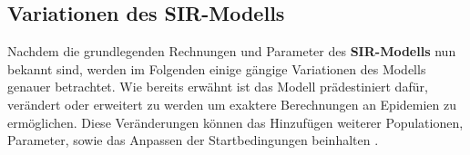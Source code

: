 \documentclass[12pt]{scrartcl} %
\begin{document}










\subsection{Variationen des SIR-Modells}

Nachdem die grundlegenden Rechnungen und Parameter des \textbf{SIR-Modells} nun bekannt sind, werden im Folgenden einige gängige Variationen des Modells genauer betrachtet. Wie bereits erwähnt ist das Modell prädestiniert dafür, verändert oder erweitert zu werden um exaktere Berechnungen an Epidemien zu ermöglichen. Diese Veränderungen können das Hinzufügen weiterer Populationen, Parameter, sowie das Anpassen der Startbedingungen beinhalten \cite{5}.
\end{document}
